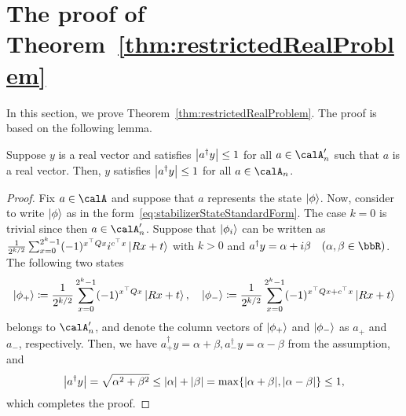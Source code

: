 \documentclass[\main/main]{subfiles}
\begin{document}

\section{The proof of Theorem~\ref{thm:restrictedRealProblem}}

In this section, we prove Theorem~\ref{thm:restrictedRealProblem}.
The proof is based on the following lemma.
\begin{lemma}{\label{lem:absRealForTIsAbsRealForS}}
    Suppose $y$ is a real vector and satisfies
    $\abs{a^\dagger y} \leq 1$ for all $a \in \calA'_n$
    such that $a$ is a real vector.
    Then, $y$ satisfies
    $\abs{a^\dagger y} \leq 1$ for all $a \in \calA_n$.
\end{lemma}
\begin{proof}
    Fix $a \in \calA$ and suppose that $a$ represents
    the state $\ket{\phi}$.
    Now, consider to write $\ket{\phi}$ as in the form~\eqref{eq:stabilizerStateStandardForm}.
    The case $k=0$ is trivial since then $a \in \calA'_n$.
    Suppose that $\ket{\phi_i}$ can be written as
    $\frac{1}{2^{k/2}}\sum_{x=0}^{2^k-1} (-1)^{x^\top Q x} i^{c^\top x} \ket{Rx+t}$ with $k>0$
    and
    $a^\dagger y = \alpha + i\beta \quad (\alpha, \beta \in \bbR)$.
    The following two states
    \begin{equation*}
        \ket{\phi_+} \coloneqq \frac{1}{2^{k/2}}\sum_{x=0}^{2^k-1} (-1)^{x^\top Q x} \ket{Rx+t}, \quad
        \ket{\phi_-} \coloneqq \frac{1}{2^{k/2}}\sum_{x=0}^{2^k-1} (-1)^{x^\top Q x + c^\top x} \ket{Rx+t}
    \end{equation*}
    belongs to $\calA'_n$,
    and denote the column vectors of $\ket{\phi_+}$ and $\ket{\phi_-}$ as $a_+$ and $a_-$, respectively.
    Then, we have $a_+^\dagger y = \alpha+\beta, a_-^\dagger y = \alpha-\beta$
    from the assumption, and
    \begin{equation*}
        \abs{a^\dagger y}
        =\sqrt{\alpha^2 + \beta^2}
        \leq \abs{\alpha}+\abs{\beta}
        = \max\{\abs{\alpha+\beta}, \abs{\alpha-\beta}\}
        \leq 1,
    \end{equation*}
    which completes the proof.
\end{proof}
\end{document}
